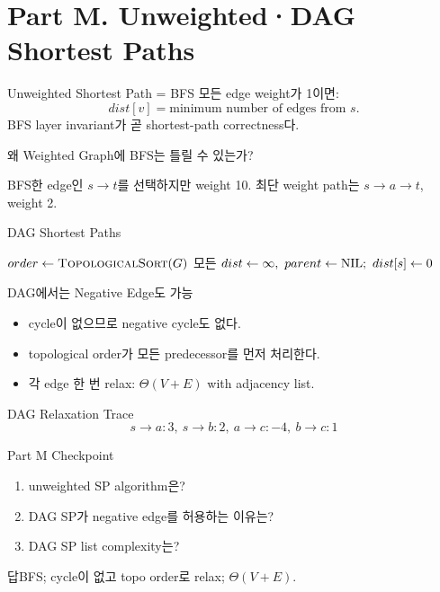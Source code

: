 \section{Part M. Unweighted·DAG Shortest Paths}
\begin{frame}{Unweighted Shortest Path = BFS}
모든 edge weight가 1이면:
\[
dist[v]=\text{minimum number of edges from }s.
\]
BFS layer invariant가 곧 shortest-path correctness다.
\end{frame}
\begin{frame}{왜 Weighted Graph에 BFS는 틀릴 수 있는가?}
\centering{}
\begin{alertblock}{BFS}한 edge인 \(s\to t\)를 선택하지만 weight 10. 최단 weight path는 \(s\to a\to t\), weight 2.\end{alertblock}
\end{frame}
\begin{frame}{DAG Shortest Paths}
\algofont\begin{algorithmic}[1]
\State \(order\gets\Call{TopologicalSort}{G}\)
\State 모든 \(dist\gets\infty,\ parent\gets\NIL;\ dist[s]\gets0\)
\State{}\EndFor\EndIf\EndFor\EndProcedure
\end{algorithmic}
\end{frame}
\begin{frame}{DAG에서는 Negative Edge도 가능}
\begin{itemize}\item cycle이 없으므로 negative cycle도 없다.\item topological order가 모든 predecessor를 먼저 처리한다.\item 각 edge 한 번 relax: \(\Theta(V+E)\) with adjacency list.\end{itemize}
\end{frame}
\begin{frame}{DAG Relaxation Trace}
\[
s\to a:3,\ s\to b:2,\ a\to c:-4,\ b\to c:1
\]
\end{frame}
\begin{frame}{Part M Checkpoint}
\begin{enumerate}\item unweighted SP algorithm은?\item DAG SP가 negative edge를 허용하는 이유는?\item DAG SP list complexity는?\end{enumerate}
\begin{exampleblock}{답}BFS; cycle이 없고 topo order로 relax; \(\Theta(V+E)\).\end{exampleblock}
\end{frame}
